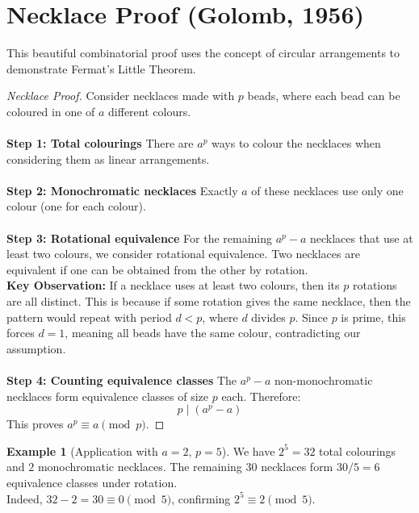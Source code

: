 \documentclass[12pt,openany]{book}
\theoremstyle{definition}
\newtheorem{example}{Example}[chapter]
\theoremstyle{plain}
\theoremstyle{remark}
\begin{document}
\section{Necklace Proof (Golomb, 1956)}

This beautiful combinatorial proof uses the concept of circular arrangements to demonstrate Fermat's Little Theorem.

\begin{proof}[Necklace Proof]
Consider necklaces made with $p$ beads, where each bead can be coloured in one of $a$ different colours.
\noindent
\\
\\
\textbf{Step 1: Total colourings}
There are $a^p$ ways to colour the necklaces when considering them as linear arrangements.
\noindent
\\
\\
\textbf{Step 2: Monochromatic necklaces}
Exactly $a$ of these necklaces use only one colour (one for each colour).
\noindent
\\
\\
\textbf{Step 3: Rotational equivalence}
For the remaining $a^p - a$ necklaces that use at least two colours, we consider rotational equivalence. Two necklaces are equivalent if one can be obtained from the other by rotation.
\noindent
\\
\textbf{Key Observation:} If a necklace uses at least two colours, then its $p$ rotations are all distinct. This is because if some rotation gives the same necklace, then the pattern would repeat with period $d < p$, where $d$ divides $p$. Since $p$ is prime, this forces $d = 1$, meaning all beads have the same colour, contradicting our assumption.
\noindent
\\
\\
\textbf{Step 4: Counting equivalence classes}
The $a^p - a$ non-monochromatic necklaces form equivalence classes of size $p$ each. Therefore:
\[
p \mid (a^p - a)
\]
\noindent
This proves $a^p \equiv a \pmod{p}$.
\end{proof}

\begin{example}[Application with $a=2$, $p=5$]
We have $2^5 = 32$ total colourings and $2$ monochromatic necklaces. The remaining $30$ necklaces form $30/5 = 6$ equivalence classes under rotation.
\noindent
\\
Indeed, $32 - 2 = 30 \equiv 0 \pmod{5}$, confirming $2^5 \equiv 2 \pmod{5}$.
\end{example}

\newpage
\end{document}

